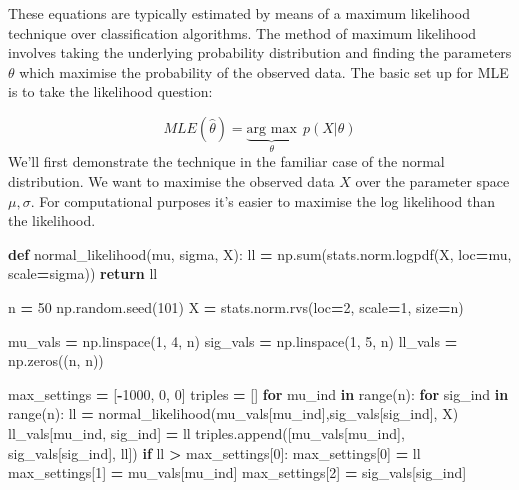 \documentclass[
]{book}
\newenvironment{Shaded}{\begin{snugshade}}{\end{snugshade}}
\newcommand{\BuiltInTok}[1]{#1}
\newcommand{\ControlFlowTok}[1]{\textcolor[rgb]{0.13,0.29,0.53}{\textbf{#1}}}
\newcommand{\DecValTok}[1]{\textcolor[rgb]{0.00,0.00,0.81}{#1}}
\newcommand{\KeywordTok}[1]{\textcolor[rgb]{0.13,0.29,0.53}{\textbf{#1}}}
\newcommand{\NormalTok}[1]{#1}
\newcommand{\OperatorTok}[1]{\textcolor[rgb]{0.81,0.36,0.00}{\textbf{#1}}}
\theoremstyle{definition}
\theoremstyle{definition}
\theoremstyle{definition}
\theoremstyle{remark}
\begin{document}
These equations are typically estimated by means of a maximum likelihood technique over classification algorithms. The method of maximum likelihood involves taking the underlying probability distribution and finding the parameters \(\theta\) which maximise the probability of the observed data. The basic set up for MLE is to take the likelihood question:

\[ MLE(\hat{\theta}) = \underbrace{\text{arg max}}_{\theta} \ \ p(X | \theta) \]
We'll first demonstrate the technique in the familiar case of the normal distribution. We want to maximise the observed data \(X\) over the parameter space \(\mu, \sigma\). For computational purposes it's easier to maximise the log likelihood than the likelihood.

\begin{Shaded}
\begin{Highlighting}[]

\KeywordTok{def}\NormalTok{ normal\_likelihood(mu, sigma, X):}
\NormalTok{  ll }\OperatorTok{=}\NormalTok{ np.}\BuiltInTok{sum}\NormalTok{(stats.norm.logpdf(X, loc}\OperatorTok{=}\NormalTok{mu, scale}\OperatorTok{=}\NormalTok{sigma))}
  \ControlFlowTok{return}\NormalTok{ ll}

\NormalTok{n }\OperatorTok{=} \DecValTok{50}
\NormalTok{np.random.seed(}\DecValTok{101}\NormalTok{)}
\NormalTok{X }\OperatorTok{=}\NormalTok{ stats.norm.rvs(loc}\OperatorTok{=}\DecValTok{2}\NormalTok{, scale}\OperatorTok{=}\DecValTok{1}\NormalTok{, size}\OperatorTok{=}\NormalTok{n)}

\NormalTok{mu\_vals }\OperatorTok{=}\NormalTok{ np.linspace(}\DecValTok{1}\NormalTok{, }\DecValTok{4}\NormalTok{, n)}
\NormalTok{sig\_vals }\OperatorTok{=}\NormalTok{ np.linspace(}\DecValTok{1}\NormalTok{, }\DecValTok{5}\NormalTok{, n)}
\NormalTok{ll\_vals }\OperatorTok{=}\NormalTok{ np.zeros((n, n))}

\NormalTok{max\_settings }\OperatorTok{=}\NormalTok{ [}\OperatorTok{{-}}\DecValTok{1000}\NormalTok{, }\DecValTok{0}\NormalTok{, }\DecValTok{0}\NormalTok{]}
\NormalTok{triples }\OperatorTok{=}\NormalTok{ []}
\ControlFlowTok{for}\NormalTok{ mu\_ind }\KeywordTok{in} \BuiltInTok{range}\NormalTok{(n):}
  \ControlFlowTok{for}\NormalTok{ sig\_ind }\KeywordTok{in} \BuiltInTok{range}\NormalTok{(n):}
\NormalTok{    ll }\OperatorTok{=}\NormalTok{ normal\_likelihood(mu\_vals[mu\_ind],sig\_vals[sig\_ind], X)}
\NormalTok{    ll\_vals[mu\_ind, sig\_ind] }\OperatorTok{=}\NormalTok{ ll}
\NormalTok{    triples.append([mu\_vals[mu\_ind], sig\_vals[sig\_ind], ll])}
    \ControlFlowTok{if}\NormalTok{ ll }\OperatorTok{\textgreater{}}\NormalTok{ max\_settings[}\DecValTok{0}\NormalTok{]:}
\NormalTok{        max\_settings[}\DecValTok{0}\NormalTok{] }\OperatorTok{=}\NormalTok{ ll}
\NormalTok{        max\_settings[}\DecValTok{1}\NormalTok{] }\OperatorTok{=}\NormalTok{ mu\_vals[mu\_ind]}
\NormalTok{        max\_settings[}\DecValTok{2}\NormalTok{] }\OperatorTok{=}\NormalTok{ sig\_vals[sig\_ind]}
                                                   

\end{Highlighting}
\end{Shaded}
\end{document}
